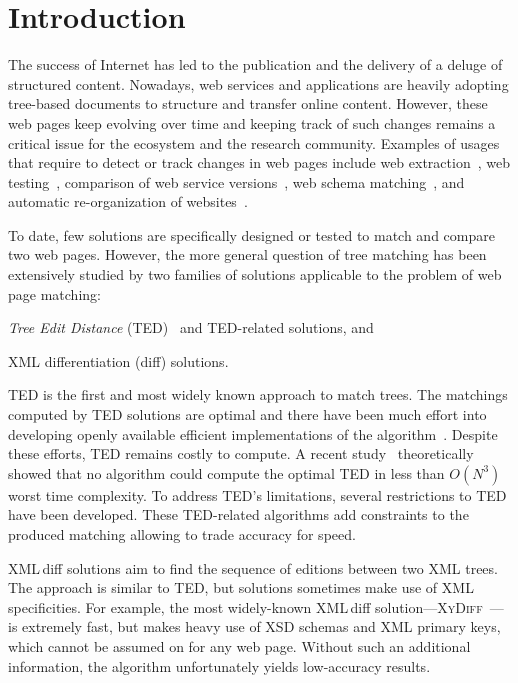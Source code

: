 \section{Introduction} 
The success of Internet has led to the publication and the delivery of a deluge of structured content.
Nowadays, web services and applications are heavily adopting tree-based documents to structure and transfer online content.
However, these web pages keep evolving over time and keeping track of such changes remains a critical issue for the ecosystem and the research community.
Examples of usages that require to detect or track changes in web pages include web extraction~\cite{reis2004automatic,yao2013answer,zhai2005web}, web testing~\cite{choudhary2011water,stocco2017apogen}, comparison of web service versions~\cite{fokaefs2011empirical}, web schema matching~\cite{hao2007web}, and automatic re-organization of websites~\cite{Kumar2011_Bricolage}.

To date, few solutions are specifically designed or tested to match and compare two web pages.
However, the more general question of tree matching has been extensively studied by two families of solutions applicable to the problem of web page matching: 
\begin{inparaenum}
\item \emph{Tree Edit Distance} (TED)~\cite{Tai1979} and TED-related solutions, and
\item XML differentiation (diff) solutions.
\end{inparaenum}

TED is the first and most widely known approach to match trees.
The matchings computed by TED solutions are optimal and there have been much effort into developing openly available efficient implementations of the algorithm~\cite{Pawlik2011,pawlik2015efficient,pawlik2016tree}.
Despite these efforts, TED remains costly to compute. A recent study~\cite{bringmann2018tree} theoretically showed that no algorithm could compute the optimal TED in less than $O(N^3)$ worst time complexity.
To address TED's limitations, several restrictions to TED have been developed. These TED-related algorithms add constraints to the produced matching allowing to trade accuracy for speed.

XML\,diff solutions aim to find the sequence of editions between two XML trees.
The approach is similar to TED, but solutions sometimes make use of XML specificities.
For example, the most widely-known XML\,diff solution---\textsc{XyDiff}~\cite{Cobena2002DetectingDocuments}---is extremely fast, but makes heavy use of XSD schemas and XML primary keys, which cannot be assumed on for any web page.
Without such an additional information, the algorithm unfortunately yields low-accuracy results.

